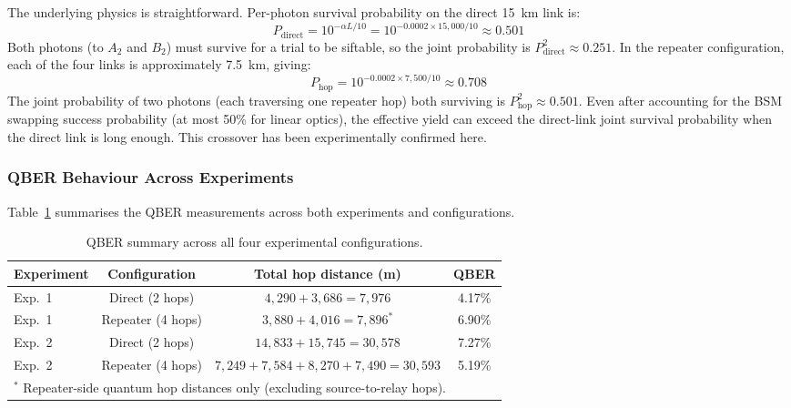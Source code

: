 \documentclass[12pt,oneside,letterpaper,english]{article}
\begin{document}
The underlying physics is straightforward. Per-photon survival probability on the
direct 15~km link is:
\begin{equation}
    P_{\text{direct}} = 10^{-\alpha L / 10} = 10^{-0.0002 \times 15{,}000 / 10} \approx 0.501
\end{equation}
Both photons (to $A_2$ and $B_2$) must survive for a trial to be siftable, so the
joint probability is $P_{\text{direct}}^2 \approx 0.251$. In the repeater
configuration, each of the four links is approximately 7.5~km, giving:
\begin{equation}
    P_{\text{hop}} = 10^{-0.0002 \times 7{,}500 / 10} \approx 0.708
\end{equation}
The joint probability of two photons (each traversing one repeater hop) both
surviving is $P_{\text{hop}}^2 \approx 0.501$. Even after accounting for the
BSM swapping success probability (at most 50\% for linear optics), the
effective yield can exceed the direct-link joint survival probability when the
direct link is long enough. This crossover has been experimentally confirmed here.

\subsubsection{QBER Behaviour Across Experiments}

Table~\ref{tab:qber_summary} summarises the QBER measurements across both
experiments and configurations.

\begin{table}[h!]
\centering
\caption{QBER summary across all four experimental configurations.}
\label{tab:qber_summary}
\begin{tabular}{lccc}
\toprule
\textbf{Experiment} & \textbf{Configuration} & \textbf{Total hop distance (m)} & \textbf{QBER} \\
\midrule
Exp.\ 1 & Direct (2 hops) & $4{,}290 + 3{,}686 = 7{,}976$ & 4.17\% \\
Exp.\ 1 & Repeater (4 hops) & $3{,}880 + 4{,}016 = 7{,}896^*$ & 6.90\% \\
Exp.\ 2 & Direct (2 hops) & $14{,}833 + 15{,}745 = 30{,}578$ & 7.27\% \\
Exp.\ 2 & Repeater (4 hops) & $7{,}249 + 7{,}584 + 8{,}270 + 7{,}490 = 30{,}593$ & 5.19\% \\
\bottomrule
\multicolumn{4}{l}{\scriptsize $^*$ Repeater-side quantum hop distances only (excluding source-to-relay hops).}
\end{tabular}
\end{table}
\end{document}
